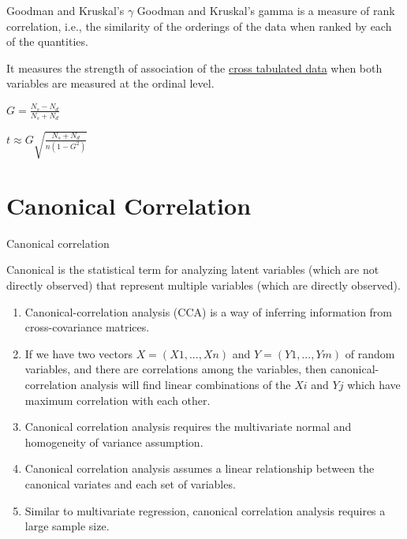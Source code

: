 \documentclass{beamer}
\begin{document}
\begin{frame}{Goodman and Kruskal's $\gamma$}
	Goodman and Kruskal's gamma is a measure of rank correlation, i.e., the similarity of the orderings of the data when ranked by each of the quantities. \\ \vspace{1cm}
	
	It measures the strength of association of the \underline{cross tabulated data} when both variables are measured at the ordinal level. \vspace{0.5cm}
	
	\begin{center}
		
$G={\frac  {N_{s}-N_{d}}{N_{s}+N_{d}}}$ \end{center} \vspace{0.5cm}
\begin{center} $ t\approx G{\sqrt  {{\frac  {N_{s}+N_{d}}{n(1-G^{2})}}}}$
	\end{center}
\end{frame}

\section{Canonical Correlation}

\begin{frame}{Canonical correlation}
\begin{center}
	Canonical is the statistical term for analyzing latent variables (which are not directly observed) that represent multiple variables (which are directly observed). 
\end{center}

\fontsize{8} \selectfont 
	\begin{enumerate}
		\item Canonical-correlation analysis (CCA) is a way of inferring information from cross-covariance matrices.
		\item If we have two vectors $X = (X1, ..., Xn)$ and $Y = (Y1, ..., Ym)$ of random variables, and there are correlations among the variables, then canonical-correlation analysis will find linear combinations of the $Xi$ and $Yj$ which have maximum correlation with each other.
		\item Canonical correlation analysis requires the multivariate normal and homogeneity of variance assumption.
		\item Canonical correlation analysis assumes a linear relationship between the canonical variates and each set of variables.
		\item Similar to multivariate regression, canonical correlation analysis requires a large sample size.
	\end{enumerate}
\end{frame}
\end{document}
